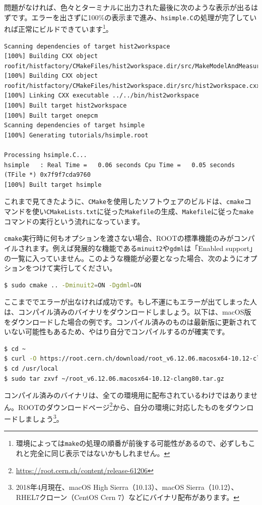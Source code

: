 問題がなければ、色々とターミナルに出力された最後に次のような表示が出るはずです。エラーを出さずに100\%の表示まで進み、\texttt{hsimple.C}の処理が完了していれば正常にビルドできています\footnote{環境によっては\texttt{make}の処理の順番が前後する可能性があるので、必ずしもこれと完全に同じ表示ではないかもしれません。}。
\begin{lstlisting}
Scanning dependencies of target hist2workspace
[100%] Building CXX object roofit/histfactory/CMakeFiles/hist2workspace.dir/src/MakeModelAndMeasurements.cxx.o
[100%] Building CXX object roofit/histfactory/CMakeFiles/hist2workspace.dir/src/hist2workspace.cxx.o
[100%] Linking CXX executable ../../bin/hist2workspace
[100%] Built target hist2workspace
[100%] Built target onepcm
Scanning dependencies of target hsimple
[100%] Generating tutorials/hsimple.root

Processing hsimple.C...
hsimple   : Real Time =   0.06 seconds Cpu Time =   0.05 seconds
(TFile *) 0x7f9f7cda9760
[100%] Built target hsimple
\end{lstlisting}

これまで見てきたように、\texttt{CMake}を使用したソフトウェアのビルドは、\texttt{cmake}コマンドを使い\texttt{CMakeLists.txt}に従った\texttt{Makefile}の生成、\texttt{Makefile}に従った\texttt{make}コマンドの実行という流れになっています。

\texttt{cmake}実行時に何もオプションを渡さない場合、ROOTの標準機能のみがコンパイルされます。例えば発展的な機能である\texttt{minuit2}や\texttt{gdml}は「Enabled support」の一覧に入っていません。このような機能が必要となった場合、次のようにオプションをつけて実行してください。

\begin{lstlisting}[language=bash]
$ sudo cmake .. -Dminuit2=ON -Dgdml=ON
\end{lstlisting}

ここまででエラーが出なければ成功です。もし不運にもエラーが出てしまった人は、コンパイル済みのバイナリをダウンロードしましょう。以下は、macOS版をダウンロードした場合の例です。コンパイル済みのものは最新版に更新されていない可能性もあるため、やはり自分でコンパイルするのが確実です。
\begin{lstlisting}[language=bash]
$ cd ~
$ curl -O https://root.cern.ch/download/root_v6.12.06.macosx64-10.12-clang80.tar.gz
$ cd /usr/local
$ sudo tar zxvf ~/root_v6.12.06.macosx64-10.12-clang80.tar.gz
\end{lstlisting}
コンパイル済みのバイナリは、全ての環境用に配布されているわけではありません。ROOTのダウンロードページ\footnote{\url{https://root.cern.ch/content/release-61206}}から、自分の環境に対応したものをダウンロードしましょう\footnote{2018年4月現在、macOS High Sierra（10.13）、macOS Sierra（10.12）、RHEL7クローン（CentOS Cern 7）などにバイナリ配布があります。}。

